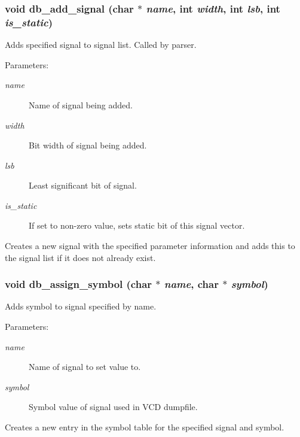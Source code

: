 \subsubsection{\setlength{\rightskip}{0pt plus 5cm}void db\_\-add\_\-signal (char $\ast$ {\em name}, int {\em width}, int {\em lsb}, int {\em is\_\-static})}\label{db_8h_a4}


Adds specified signal to signal list. Called by parser.

\begin{Desc}
\item[Parameters: ]\par
\begin{description}
\item[{\em 
name}]Name of signal being added. \item[{\em 
width}]Bit width of signal being added. \item[{\em 
lsb}]Least significant bit of signal. \item[{\em 
is\_\-static}]If set to non-zero value, sets static bit of this signal vector.\end{description}
\end{Desc}
Creates a new signal with the specified parameter information and adds this to the signal list if it does not already exist. 
\subsubsection{\setlength{\rightskip}{0pt plus 5cm}void db\_\-assign\_\-symbol (char $\ast$ {\em name}, char $\ast$ {\em symbol})}\label{db_8h_a9}


Adds symbol to signal specified by name.

\begin{Desc}
\item[Parameters: ]\par
\begin{description}
\item[{\em 
name}]Name of signal to set value to. \item[{\em 
symbol}]Symbol value of signal used in VCD dumpfile.\end{description}
\end{Desc}
Creates a new entry in the symbol table for the specified signal and symbol. 
